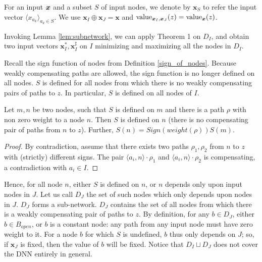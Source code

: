 			
			
			For an input $\boldsymbol{x}$ and a subset $S$ of input nodes, we denote by 
			$\boldsymbol{x}_S$ to refer the input vector $\langle x_{a_k}\rangle_{a_k\in S}$. We use $\boldsymbol{x}_I\oplus \boldsymbol{x}_J = \boldsymbol{x}$ and 
			${\textrm{value}}_{\boldsymbol{x}_I,\boldsymbol{x}_J} (z)={\textrm{value}}_{\boldsymbol{x}}(z)$. 
			
			
			Invoking Lemma \ref{lem:subnetwork}, we can apply Theorem 1 on $D_I$, and obtain two input vectors $\boldsymbol{x}_I^*,\boldsymbol{x}_I^{\sharp}$ on $I$
			minimizing and maximizing all the nodes in $D_I$.

			\smallskip

		
			Recall the sign function of nodes from Definition \ref{sign_of_nodes}. 
			Because weakly compensating paths are allowed, the sign function is no longer defined on all nodes. $S$ is defined for all nodes from which there is no weakly compensating pairs of paths to $z$. In particular, $S$ is defined on all nodes of $I$.

			\begin{lemma}\label{lem:sign}
				Let $m,n$ be two nodes, such that $S$ is defined on $m$ and there is a path $\rho$ with non zero weight to a node $n$. Then $S$ is defined on $n$
				 (there is no compensating pair of paths from $n$ to $z$).
				Further, $S(n)= Sign(weight(\rho)) S(m)$.
			\end{lemma}
			
			\begin{proof}
				By contradiction, assume that there exists two paths $\rho_1,\rho_2$ from 
				$n$ to $z$ with (strictly) different signs. The pair $\langle a_i,n\rangle \cdot \rho_1$ and $\langle a_i,n\rangle \cdot \rho_2$ is compensating, a contradiction with $a_i\in I$. 
			\end{proof}

			Hence, for all node $n$, either $S$ is defined on $n$, or 
			$n$ depends only upon input nodes in $J$.
			Let us call $D_J$ the set of such nodes which only depends upon nodes in $J$.
			$D_J$ forms a sub-network.
			$D_J$ contains the set of all nodes from which there is a weakly compensating pair of paths to $z$.
			By definition, for any $b\in D_J$, either $b\in B_{open}$, or $b$ is a constant node: any path from any input node must have zero weight to it.
			For a node $b$ for which $S$ is undefined, $b$ thus only depends on $J$; so, if $\boldsymbol{x}_J$ is fixed, then the value of $b$ will be fixed.
			Notice that $D_I \sqcup D_J$ does not cover the DNN entirely in general.
			
